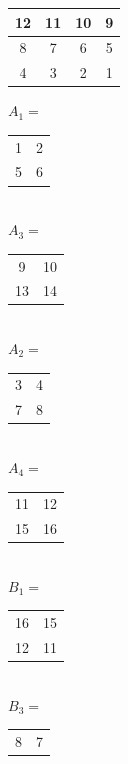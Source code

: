 \documentclass{article}
\begin{document}
\begin{enumerate}
\begin{multicols}{2}
\begin{center}
\begin{tabular}{|c c|c c|}
                12&11&10&9\\
                \hline
                8&7&6&5\\
                4&3&2&1\\
                \hline
            \end{tabular}
        \end{center}
    \end{multicols}
    \begin{multicols}{4}
        \begin{center}
            $A_1=$
            \begin{tabular}{|c c|}
                \hline
                1&2\\
                5&6\\
                \hline
            \end{tabular}\\
            $A_3=$
            \begin{tabular}{|c c|}
                \hline
                9&10\\
                13&14\\
                \hline
            \end{tabular}\\
            $A_2=$
            \begin{tabular}{|c c|}
                \hline
                3&4\\
                7&8\\
                \hline
            \end{tabular}\\
            $A_4=$
            \begin{tabular}{|c c|}
                \hline
                11&12\\
                15&16\\
                \hline
            \end{tabular}\\
            $B_1=$
            \begin{tabular}{|c c|}
                \hline
                16&15\\
                12&11\\
                \hline
            \end{tabular}\\
            $B_3=$
            \begin{tabular}{|c c|}
                \hline
                8&7\\

\end{tabular}
\end{center}
\end{multicols}
\end{enumerate}
\end{document}
